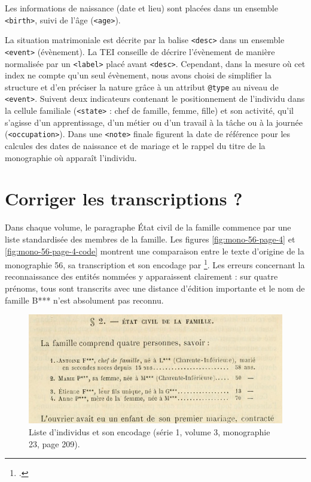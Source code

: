 Les informations de naissance (date et lieu) sont placées dans un ensemble \texttt{<birth>}, suivi de l'âge (\texttt{<age>}).

La situation matrimoniale est décrite par la balise \texttt{<desc>} dans un ensemble \texttt{<event>} (évènement). La TEI conseille de décrire l'évènement de manière normalisée par un \texttt{<label>} placé avant \texttt{<desc>}. Cependant, dans la mesure où cet index ne compte qu'un seul évènement, nous avons choisi de simplifier la structure et d'en préciser la nature grâce à un attribut \texttt{@type} au niveau de \texttt{<event>}. Suivent deux indicateurs contenant le positionnement de l'individu dans la cellule familiale (\texttt{<state>} : chef de famille, femme, fille) et son activité, qu'il s'agisse d'un apprentissage, d'un métier ou d'un travail à la tâche ou à la journée (\texttt{<occupation>}). Dans une \texttt{<note>} finale figurent la date de référence pour les calcules des dates de naissance et de mariage et le rappel du titre de la monographie où apparaît l'individu.

\section{Corriger les transcriptions ?}

Dans chaque volume, le paragraphe \og État civil de la famille \fg{} commence par une liste standardisée des membres de la famille. Les figures \ref{fig:mono-56-page-4} et \ref{fig:mono-56-page-4-code} montrent une comparaison entre le texte d'origine de la monographie 56, sa transcription et son encodage par \lse\footcite[p. 4]{mono056a}. Les erreurs concernant la reconnaissance des entités nommées y apparaissent clairement : sur quatre prénoms, tous sont transcrits avec une distance d'édition importante et le nom de famille \og B*** \fg{} n'est absolument pas reconnu.

\begin{figure}[h]
    \includegraphics[width=14cm]{img/mono-23-page-209.jpg}
    \caption[Liste d'individus au début du paragraphe 2 (\no{} 23)]{Liste d'individus et son encodage (série 1, volume 3, monographie \no{} 23, page 209).}
    \label{fig:mono-23-page-209}
\end{figure}

